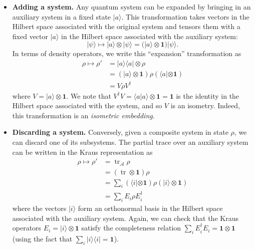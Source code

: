\documentclass[fleqn]{article}
\begin{document}
\begin{itemize}
\item
  \textbf{Adding a system.}
  Any quantum system can be expanded by bringing in an auxiliary system in a fixed state \(|a\rangle\).
  This transformation takes vectors in the Hilbert space associated with the original system and tensors them with a fixed vector \(|a\rangle\) in the Hilbert space associated with the auxiliary system:
  \[
      |\psi\rangle
      \longmapsto |a\rangle\otimes|\psi\rangle
      = (|a\rangle\otimes\mathbf{1}) |\psi\rangle.
    \]
  In terms of density operators, we write this ``expansion'' transformation as
  \[
      \begin{aligned}
        \rho
        \longmapsto \rho'
        &= |a\rangle\langle a|\otimes\rho
      \\&= (|a\rangle\otimes\mathbf{1})\rho (\langle a|\otimes\mathbf{1})
      \\&= V\rho V^\dagger
      \end{aligned}
    \]
  where \(V=|a\rangle\otimes\mathbf{1}\).
  We note that \(V^\dagger V=\langle a|a\rangle\otimes\mathbf{1}=\mathbf{1}\) is the identity in the Hilbert space associated with the system, and so \(V\) is an isometry.
  Indeed, this transformation is an \emph{isometric embedding}.
\item
  \textbf{Discarding a system.}
  Conversely, given a composite system in state \(\rho\), we can discard one of its subsystems.
  The partial trace over an auxiliary system can be written in the Kraus representation as
  \[
      \begin{aligned}
        \rho
        \longmapsto \rho'
        &= \operatorname{tr}_\mathcal{A}\rho
      \\&= (\operatorname{tr}\otimes\mathbf{1})\rho
      \\&= \sum_i (\langle i|\otimes\mathbf{1})\rho(|i\rangle\otimes\mathbf{1})
      \\&= \sum_i E_i\rho E^\dagger_i
      \end{aligned}
    \]
  where the vectors \(|i\rangle\) form an orthonormal basis in the Hilbert space associated with the auxiliary system.
  Again, we can check that the Kraus operators \(E_i=|i\rangle\otimes\mathbf{1}\) satisfy the completeness relation \(\sum_i E^\dagger_i E_i =\mathbf{1}\otimes\mathbf{1}\) (using the fact that \(\sum_i|i\rangle\langle i|=\mathbf{1}\)).
\end{itemize}
\end{document}
